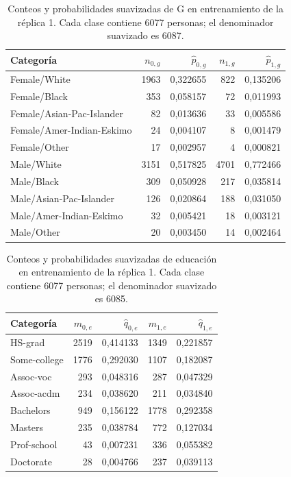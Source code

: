 \documentclass[11pt,a4paper]{article}
\begin{document}
\begin{table}[H]
\centering
\caption[Conteos y probabilidades suavizadas de G en entrenamiento de la réplica 1.]{Conteos y probabilidades suavizadas de G en entrenamiento de la réplica 1. Cada clase contiene 6077 personas; el denominador suavizado es 6087.}\label{tab:pg}
\small
\setlength{\tabcolsep}{4pt}
\begin{tabular}{lrrrr}
\toprule
Categoría & $n_{0,g}$ & $\widehat p_{0,g}$ & $n_{1,g}$ & $\widehat p_{1,g}$ \\
\midrule
Female/White & 1963 & 0,322655 & 822 & 0,135206 \\
Female/Black & 353 & 0,058157 & 72 & 0,011993 \\
Female/Asian-Pac-Islander & 82 & 0,013636 & 33 & 0,005586 \\
Female/Amer-Indian-Eskimo & 24 & 0,004107 & 8 & 0,001479 \\
Female/Other & 17 & 0,002957 & 4 & 0,000821 \\
Male/White & 3151 & 0,517825 & 4701 & 0,772466 \\
Male/Black & 309 & 0,050928 & 217 & 0,035814 \\
Male/Asian-Pac-Islander & 126 & 0,020864 & 188 & 0,031050 \\
Male/Amer-Indian-Eskimo & 32 & 0,005421 & 18 & 0,003121 \\
Male/Other & 20 & 0,003450 & 14 & 0,002464 \\
\bottomrule
\end{tabular}
\end{table}
\begin{table}[H]
\centering
\caption[Conteos y probabilidades suavizadas de educación en entrenamiento de la réplica 1.]{Conteos y probabilidades suavizadas de educación en entrenamiento de la réplica 1. Cada clase contiene 6077 personas; el denominador suavizado es 6085.}\label{tab:qe}
\small
\setlength{\tabcolsep}{4pt}
\begin{tabular}{lrrrr}
\toprule
Categoría & $m_{0,e}$ & $\widehat q_{0,e}$ & $m_{1,e}$ & $\widehat q_{1,e}$ \\
\midrule
HS-grad & 2519 & 0,414133 & 1349 & 0,221857 \\
Some-college & 1776 & 0,292030 & 1107 & 0,182087 \\
Assoc-voc & 293 & 0,048316 & 287 & 0,047329 \\
Assoc-acdm & 234 & 0,038620 & 211 & 0,034840 \\
Bachelors & 949 & 0,156122 & 1778 & 0,292358 \\
Masters & 235 & 0,038784 & 772 & 0,127034 \\
Prof-school & 43 & 0,007231 & 336 & 0,055382 \\
Doctorate & 28 & 0,004766 & 237 & 0,039113 \\
\bottomrule
\end{tabular}
\end{table}
\end{document}

